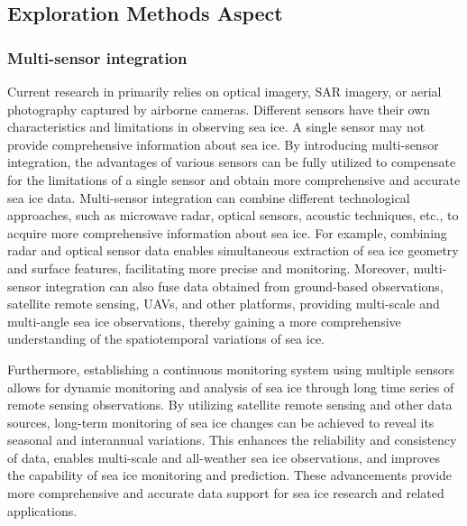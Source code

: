 \subsection{Exploration Methods Aspect} 

\subsubsection{Multi-sensor integration}
Current research in  primarily relies on optical imagery, SAR imagery, or aerial photography captured by airborne cameras. Different sensors have their own characteristics and limitations in observing sea ice. A single sensor may not provide comprehensive information about sea ice. By introducing multi-sensor integration, the advantages of various sensors can be fully utilized to compensate for the limitations of a single sensor and obtain more comprehensive and accurate sea ice data. Multi-sensor integration can combine different technological approaches, such as microwave radar, optical sensors, acoustic techniques, etc., to acquire more comprehensive information about sea ice. For example, combining radar and optical sensor data enables simultaneous extraction of sea ice geometry and surface features, facilitating more precise  and monitoring. Moreover, multi-sensor integration can also fuse data obtained from ground-based observations, satellite remote sensing, UAVs, and other platforms, providing multi-scale and multi-angle sea ice observations, thereby gaining a more comprehensive understanding of the spatiotemporal variations of sea ice.

Furthermore, establishing a continuous monitoring system using multiple sensors allows for dynamic monitoring and analysis of sea ice through long time series of remote sensing observations. By utilizing satellite remote sensing and other data sources, long-term monitoring of sea ice changes can be achieved to reveal its seasonal and interannual variations. This enhances the reliability and consistency of data, enables multi-scale and all-weather sea ice observations, and improves the capability of sea ice monitoring and prediction. These advancements provide more comprehensive and accurate data support for sea ice research and related applications.

